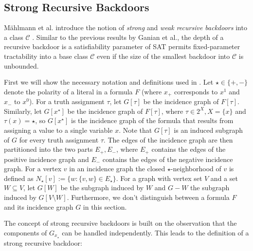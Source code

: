 \documentclass[11pt,a4paper]{article}
\theoremstyle{definition}
\theoremstyle{proposition}
\begin{document}
\subsection{Strong Recursive Backdoors}

Mählmann et al. introduce the notion of \textit{strong} and \textit{weak recursive backdoors} into a class $\mathcal{C}$ \cite{maehlmann2021recursive}. Similar to the previous results by Ganian et al., the depth of a recursive backdoor is a satisfiability parameter of SAT permits fixed-parameter tractability into a base class $\mathcal{C}$ even if the size of the smallest backdoor into $\mathcal{C}$ is unbounded. 

First we will show the necessary notation and definitions used in \cite{maehlmann2021recursive}. Let $\star \in \{+,-\}$ denote the polarity of a literal in a formula $F$ (where $x_+$ corresponds to $x^1$ and $x_-$ to $x^0$). For a truth assignment $\tau$, let $G[\tau]$ be the incidence graph of $F[\tau]$. Similarly, let $G[x^{\star}]$ be the incidence graph of $F[\tau]$, where $\tau \in 2^X, X = \{x\}$ and $\tau(x) = \star$, so $G[x^{\star}]$ is the incidence graph of the formula that results from assigning a value to a single variable $x$. Note that $G[\tau]$ is an induced subgraph of $G$ for every truth assignment $\tau$. The edges of the incidence graph are then partitioned into the two parts $E_+, E_-$, where $E_+$ contains the edges of the positive incidence graph and $E_-$ contains the edges of the negative incidence graph. For a vertex $v$ in an incidence graph the closed $\star$-neighborhood of $v$ is defined as $N_{\star}[v] := \{w \colon \{v,w\} \in E_{\star}\}$. For a graph with vertex set $V$ and a set $W \subseteq V$, let $G[W]$ be the subgraph induced by $W$ and $G - W$ the subgraph induced by $G[V \setminus{W}]$. Furthermore, we don't distinguish between a formula $F$ and its incidence graph $G$ in this section. 

The concept of strong recursive backdoors is built on the observation that the components of $G_{x_{\star}}$ can be handled independently. This leads to the definition of a strong recursive backdoor:
\end{document}
